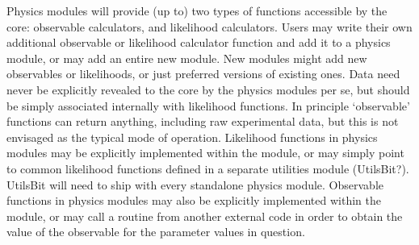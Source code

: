 Physics modules will provide (up to) two types of functions accessible by the core: observable calculators, and likelihood calculators.  Users may write their own additional observable or likelihood calculator function and add it to a physics module, or may add an entire new module.  New modules might add new observables or likelihoods, or just preferred versions of existing ones.  Data need never be explicitly revealed to the core by the physics modules per se, but should be simply associated internally with likelihood functions.  In principle `observable' functions can return anything, including raw experimental data, but this is not envisaged as the typical mode of operation.  Likelihood functions in physics modules may be explicitly implemented within the module, or may simply point to common likelihood functions defined in a separate utilities module (UtilsBit?).  UtilsBit will need to ship with every standalone physics module.  Observable functions in physics modules may also be explicitly implemented within the module, or may call a routine from another external code in order to obtain the value of the observable for the parameter values in question.

